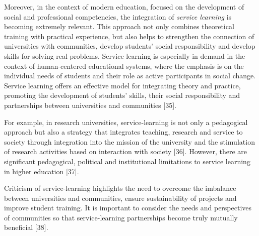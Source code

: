 Moreover, in the context of modern education, focused on the development
of social and professional competencies, the integration of
\emph{service learning} is becoming extremely relevant. This approach
not only combines theoretical training with practical experience, but
also helps to strengthen the connection of universities with
communities, develop students'{} social responsibility
and develop skills for solving real problems. Service learning is
especially in demand in the context of human-centered educational
systems, where the emphasis is on the individual needs of students and
their role as active participants in social change. Service learning
offers an effective model for integrating theory and practice, promoting
the development of students'{} skills, their social
responsibility and partnerships between universities and communities
{[}35{]}.

For example, in research universities, service-learning is not only a
pedagogical approach but also a strategy that integrates teaching,
research and service to society through integration into the mission of
the university and the stimulation of research activities based on
interaction with society {[}36{]}. However, there are significant
pedagogical, political and institutional limitations to service learning
in higher education {[}37{]}.

Criticism of service-learning highlights the need to overcome the
imbalance between universities and communities, ensure sustainability of
projects and improve student training. It is important to consider the
needs and perspectives of communities so that service-learning
partnerships become truly mutually beneficial {[}38{]}.

